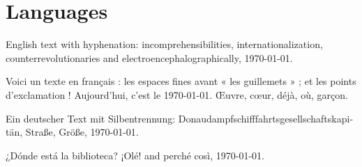 \documentclass{article}
\begin{document}
\section{Languages}
English text with hyphenation: incomprehensibilities, internationalization,
counterrevolutionaries and electroencephalographically, \today.

\begin{french}
Voici un texte en français : les espaces fines avant « les guillemets » ;
et les points d'exclamation ! Aujourd'hui, c'est le \today. Œuvre, cœur,
déjà, où, garçon.
\end{french}

\begin{german}
Ein deutscher Text mit Silbentrennung: Donaudampfschifffahrtsgesellschaftskapitän,
Straße, Größe, \today.
\end{german}

\textspanish{¿Dónde está la biblioteca? ¡Olé!} and \textitalian{perché così, \today}.
\end{document}
